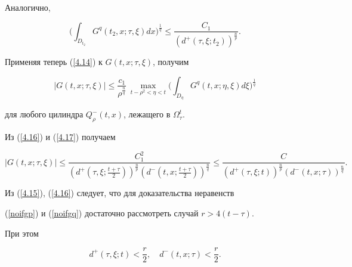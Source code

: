 Аналогично,


\begin{equation}


\bigg(\int_{D_{t_2}} G^q(t_2,x;\tau,\xi)dx \bigg)^{\frac{1}{q}}\leq


\frac{C_1}{(d^{+}(\tau,\xi;t_2))^{\frac{n}{p}}}. 


\label{4.16}


\end{equation}


Применяя теперь (\ref{4.14}) к $G(t,x;\tau,\xi)$, получим


\begin{equation}


|G(t,x;\tau,\xi)|\leq 


\frac{c_1}{\rho^{\frac{n}{q}}}\,


\max\limits_{t-\rho^2<\eta<t}


\bigg(\int_{D_\eta}G^q(t,x;\eta,\xi)d\xi\bigg)^{\frac{1}{q}}


\label{4.17}


\end{equation}


для любого цилиндра $Q_\rho^- (t,x)$, лежащего в $\Omega_\tau^t$.


Из (\ref{4.16}) и (\ref{4.17}) получаем


\begin{equation}


|G(t,x;\tau,\xi)|\leq 


\frac{C_1^2}{(d^{+}(\tau,\xi;\frac{t+\tau}{2}))^{\frac{n}{p}}


(d^{-}(t,x;\frac{t+\tau}{2}))^{\frac{n}{q}} } \le


\frac{C}{(d^{+}(\tau,\xi;t))^{\frac{n}{p}}


(d^{-}(t,x;\tau))^{\frac{n}{q}} }.


\label{4.18}


\end{equation}


Из (\ref{4.15}), (\ref{4.16}) следует, что для доказательства неравенств


(\ref{noifgp}) и (\ref{noifgq}) достаточно рассмотреть случай $r>4(t-\tau)$.


При этом 


\begin{equation}


d^+(\tau,\xi;t)<\frac{r}{2}, \quad


d^-(t,x;\tau)<\frac{r}{2}.


\label{4.19}


\end{equation}


